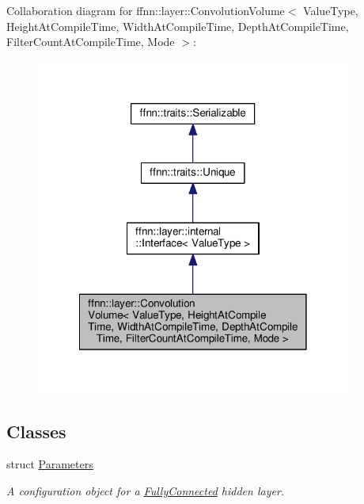 Collaboration diagram for ffnn\-:\-:layer\-:\-:Convolution\-Volume$<$ Value\-Type, Height\-At\-Compile\-Time, Width\-At\-Compile\-Time, Depth\-At\-Compile\-Time, Filter\-Count\-At\-Compile\-Time, Mode $>$\-:\nopagebreak
\begin{figure}[H]
\begin{center}
\leavevmode
\includegraphics[width=294pt]{classffnn_1_1layer_1_1_convolution_volume__coll__graph}
\end{center}
\end{figure}
\subsection*{Classes}
\begin{DoxyCompactItemize}
\item 
struct \hyperlink{structffnn_1_1layer_1_1_convolution_volume_1_1_parameters}{Parameters}
\begin{DoxyCompactList}\small\item\em A configuration object for a \hyperlink{classffnn_1_1layer_1_1_fully_connected}{Fully\-Connected} hidden layer. \end{DoxyCompactList}\end{DoxyCompactItemize}
